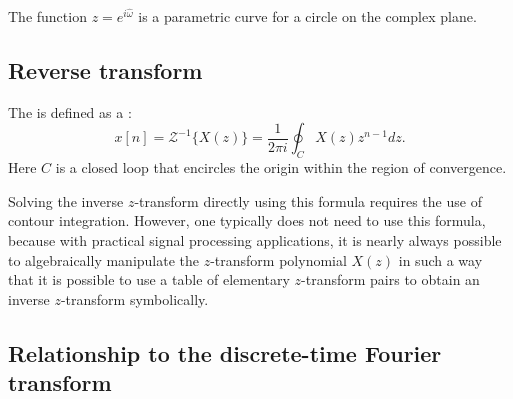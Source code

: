 \begin{marginfigure}
\begin{center}
\end{center}
\caption{The function $z=e^{i\hat{\omega}}$ is a parametric curve for a circle on the complex plane.}
\end{marginfigure}

\subsection{Reverse transform}
The  is defined as
a :
\begin{equation}
\boxed{
x[n] = \mathcal{Z}^{-1}\{X(z)\} =  \frac{1}{2 \pi i} \oint_{C} X(z) z^{n-1} dz}.
\label{izteq}
\end{equation}
Here $C$ is a closed loop that encircles the origin within the region
of convergence.

Solving the inverse $z$-transform directly using this formula requires
the use of contour integration. However, one typically does not
need to use this formula, because with practical signal processing
applications, it is nearly always possible to algebraically manipulate
the $z$-transform polynomial $X(z)$ in such a way that it is possible to
use a table of elementary $z$-transform pairs to obtain an inverse
$z$-transform symbolically.

\subsection{Relationship to the discrete-time Fourier transform}

